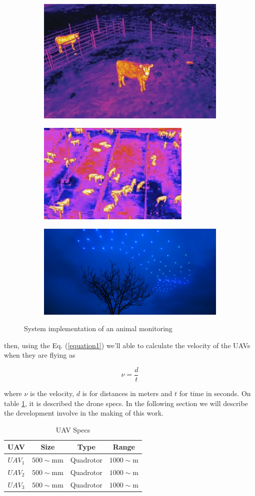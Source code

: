\documentclass{IEEEtran}
\begin{document}
\begin{figure}	
 \centering
	\begin{subfigure}{.2\textwidth}
		\includegraphics[width=3 cm]{thermalmonitoring.jpg}
        \label{thermalmonitoring} 
   \end{subfigure}
   \begin{subfigure}{.2\textwidth}
		\includegraphics[width=3 cm]{thermalmonitoring2.jpg}
        \label{thermalmonitoring2} 
   \end{subfigure}  
   \begin{subfigure}{.2\textwidth}
		\includegraphics[width=4 cm]{swarm.jpg}
        \label{swarm} 
   \end{subfigure}  
   \caption{ System implementation of an animal monitoring}
   \label{Fig2}
\end{figure}

then, using the Eq. (\ref{equation1}) we'll able to calculate the velocity of the UAVs when they are flying as 

\begin{equation}\label{equation1}
\nu = \frac{d}{t} 
\end{equation}

where $\nu$ is the velocity, $d$ is for distances in meters and $t$ for time in seconds. On table \ref{table1}, it is described the drone specs. In the following section we will describe the development involve in the making of this work. 

\begin{table}

\caption{UAV Specs}
\centering
\begin{tabular}{| c | c | c | c | }
\hline

\textbf{UAV} & \textbf{Size}	& \textbf{Type} & \textbf{Range}  \\
\hline

 $UAV_1$   & $500\sim$mm	& Quadrotor     & $1000\sim$m
      \\ 
  
 $UAV_2$   & $500\sim$mm	& Quadrotor   & $1000\sim$m        
   \\

 $UAV_3$   & $500\sim$mm	& Quadrotor     & $1000\sim$m        
    \\
\hline
\end{tabular}
\label{table1}
\end{table}
\end{document}
